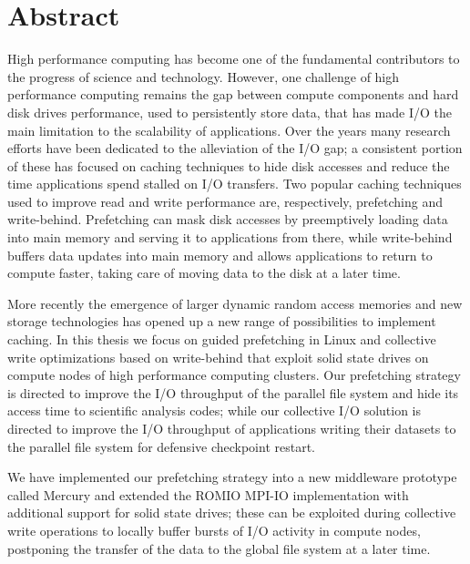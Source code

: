 \documentclass[a4paper,titlepage,oneside,11pt]{book}
\begin{document}

\newpage
\thispagestyle{empty}
\newpage

\thispagestyle{empty}
\null
\newpage
{}\setcounter{page}{1}
\chapter*{Abstract}%
High performance computing has become one of the fundamental contributors to the progress of science and technology. However, one challenge of high performance computing remains 
the gap between compute components and hard disk drives performance, used to persistently store data, that has made I/O the main limitation to the scalability of applications.
Over the years many research efforts have been dedicated to the alleviation of the I/O gap; a consistent portion of these has focused on caching techniques to hide disk accesses 
and reduce the time applications spend stalled on I/O transfers. Two popular caching techniques used to improve read and write performance are, respectively, prefetching and 
write-behind. Prefetching can mask disk accesses by preemptively loading data into main memory and serving it to applications from there, while write-behind buffers data updates 
into main memory and allows applications to return to compute faster, taking care of moving data to the disk at a later time.

More recently the emergence of larger dynamic random access memories and new storage technologies has opened up a new range of possibilities to implement caching. In this thesis 
we focus on guided prefetching in Linux and collective write optimizations based on write-behind that exploit solid state drives on compute nodes of high performance computing clusters.
Our prefetching strategy is directed to improve the I/O throughput of the parallel file system and hide its access time to scientific analysis codes; while our collective I/O solution 
is directed to improve the I/O throughput of applications writing their datasets to the parallel file system for defensive checkpoint restart.

We have implemented our prefetching strategy into a new middleware prototype called Mercury and extended the ROMIO MPI-IO implementation with additional support for solid state
drives; these can be exploited during collective write operations to locally buffer bursts of I/O activity in compute nodes, postponing the transfer of the data to the global file
system at a later time. 
\end{document}
